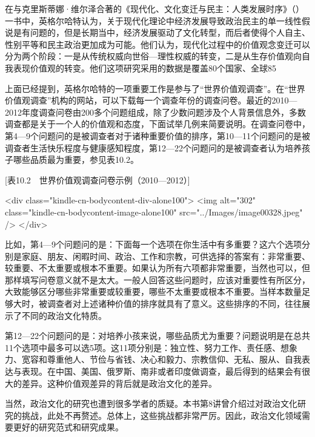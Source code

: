 在与克里斯蒂娜·维尔泽合著的《现代化、文化变迁与民主：人类发展时序》（）一书中，英格尔哈特认为，关于现代化理论中经济发展导致政治民主的单一线性假说是有问题的，但是长期当中，经济发展驱动了文化转型，而后者使得个人自主、性别平等和民主政治更加成为可能。他们认为，现代化过程中的价值观念变迁可以分为两个阶段：一是从传统权威向世俗—理性权威的转变，二是从生存价值观向自我表现价值观的转变。他们这项研究采用的数据是覆盖80个国家、全球85%

上面已经提到，英格尔哈特的一项重要工作是参与了“世界价值观调查”。在“世界价值观调查”机构的网站，可以下载每一个调查年份的调查问卷。最近的2010—2012年度调查问卷由200多个问题组成，除了少数问题涉及个人背景信息外，多数调查都是关于一个人的价值观和态度，下面试举几例来简要说明。在调查问卷中，第4—9个问题问的是被调查者对于诸种重要价值的排序，第10—11个问题问的是被调查者生活快乐程度与健康感知程度，第12—22个问题问的是被调查者认为培养孩子哪些品质最为重要，参见表10.2。

[表10.2　世界价值观调查问卷示例（2010—2012）]

<div class="kindle-cn-bodycontent-div-alone100">
 <img alt="302" class="kindle-cn-bodycontent-image-alone100" src="../Images/image00328.jpeg" />
</div>

比如，第4—9个问题问的是：下面每一个选项在你生活中有多重要？这六个选项分别是家庭、朋友、闲暇时间、政治、工作和宗教，可供选择的答案有：非常重要、较重要、不太重要或根本不重要。如果认为所有六项都非常重要，当然也可以，但那样填写问卷意义就不是太大。一般人回答这些问题时，应该对重要性有所区分，大致能够区分哪些非常重要或较重要，哪些不太重要或根本不重要。当样本数量足够大时，被调查者对上述诸种价值的排序就具有了意义。这些排序的不同，往往展示了不同的政治文化特质。

第12—22个问题问的是：对培养小孩来说，哪些品质尤为重要？问题说明是在总共11个选项中最多可以选5项。这11项分别是：独立性、努力工作、责任感、想象力、宽容和尊重他人、节俭与省钱、决心和毅力、宗教信仰、无私、服从、自我表达与表现。在中国、美国、俄罗斯、南非或者印度做调查，最后得到的结果会有很大的差异。这种价值观差异的背后就是政治文化的差异。

当然，政治文化的研究也遭到很多学者的质疑。本书第8讲曾介绍过对政治文化研究的挑战，此处不再赘述。总体上，这些挑战都非常严厉。因此，政治文化领域需要更好的研究范式和研究成果。


